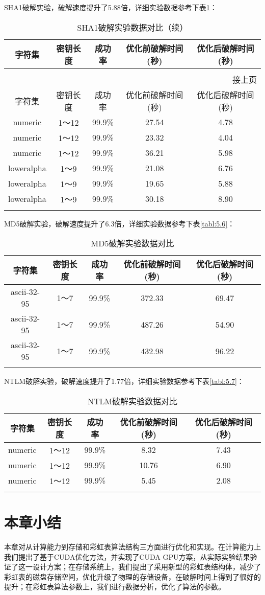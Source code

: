 SHA1破解实验，破解速度提升了5.88倍，详细实验数据参考下表\ref{tab:5.5}：
\begin{longtable}{@{\extracolsep{\fill}}ccccc}
\caption{SHA1破解实验数据对比}\\\toprule[1pt]
\multicolumn{1}{c}{字符集} &
\multicolumn{1}{c}{密钥长度} &
\multicolumn{1}{c}{成功率} &
\multicolumn{1}{c}{优化前破解时间(秒)}&
\multicolumn{1}{c}{优化后破解时间(秒)}\\\midrule
\endfirsthead
\caption[]{SHA1破解实验数据对比（续）}\\
\multicolumn{5}{r}{\footnotesize 接上页}\\
\toprule[1pt]
\multicolumn{1}{c}{字符集} &
\multicolumn{1}{c}{密钥长度} &
\multicolumn{1}{c}{成功率} &
\multicolumn{1}{c}{优化前破解时间(秒)}&
\multicolumn{1}{c}{优化后破解时间(秒)}\\\endhead
numeric & 1～12 & 99.9\% & 27.54 & 4.78 \\
numeric & 1～12 & 99.9\% & 23.32 & 4.04 \\
numeric & 1～12 & 99.9\% & 36.21 & 5.98 \\\hline
loweralpha & 1～9 & 99.9\% & 21.08 & 6.76 \\
loweralpha & 1～9 & 99.9\% & 19.65 & 5.88 \\
loweralpha & 1～9 & 99.9\% & 30.18 & 8.90 \\
\bottomrule[1pt]
\label{tab:5.5}
\end{longtable}
MD5破解实验，破解速度提升了6.3倍，详细实验数据参考下表\ref{tabl:5.6}：
\begin{longtable}{@{\extracolsep{\fill}}ccccc}
\caption{MD5破解实验数据对比}\\\toprule[1pt]
\multicolumn{1}{c}{字符集} &
\multicolumn{1}{c}{密钥长度} &
\multicolumn{1}{c}{成功率} &
\multicolumn{1}{c}{优化前破解时间(秒)}&
\multicolumn{1}{c}{优化后破解时间(秒)}\\\midrule
ascii-32-95 & 1～7 & 99.9\% & 372.33 & 69.47 \\
ascii-32-95 & 1～7 & 99.9\% & 487.26 & 54.90 \\
ascii-32-95 & 1～7 & 99.9\% & 432.98 & 96.22 \\
\bottomrule[1pt]
\label{tab:5.6}
\end{longtable}
NTLM破解实验，破解速度提升了1.77倍，详细实验数据参考下表\ref{tabl:5.7}：
\begin{longtable}{@{\extracolsep{\fill}}ccccc}
\caption{NTLM破解实验数据对比}\\\toprule[1pt]
\multicolumn{1}{c}{字符集} &
\multicolumn{1}{c}{密钥长度} &
\multicolumn{1}{c}{成功率} &
\multicolumn{1}{c}{优化前破解时间(秒)}&
\multicolumn{1}{c}{优化后破解时间(秒)}\\\midrule
numeric & 1～12 & 99.9\% & 8.32 & 7.43 \\
numeric & 1～12 & 99.9\% & 10.76 & 6.90 \\
numeric & 1～12 & 99.9\% & 5.45 & 2.08 \\
\bottomrule[1pt]
\label{tab:5.7}
\end{longtable}

\section{本章小结}
本章对从计算能力到存储和彩虹表算法结构三方面进行优化和实现。在计算能力上我们提出了基于CUDA优化方法，并实现了CUDA GPU方案，从实际实验结果验证了这一设计方案；在存储系统上，我们提出了采用新型的彩虹表结构体，减少了彩虹表的磁盘存储空间，优化升级了物理的存储设备，在破解时间上得到了很好的提升；在彩虹表算法参数上，我们进行数据分析，优化了算法的参数。


